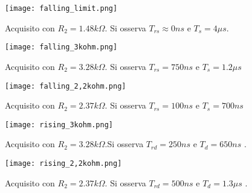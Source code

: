 \begin{figure}
	\centering
	\texttt{[image: falling\_limit.png]}
	\caption{Acquisito con $R_2=1.48 k\Omega $. Si osserva $T_{rs} \approx 0 ns$ e $T_s= 4 \mu s$.\label{f:falling_limit}}
\end{figure}

\begin{figure}
\centering
	\texttt{[image: falling\_3kohm.png]}
	\caption{Acquisito con $R_2= 3.28 k\Omega $. Si osserva $T_{rs}= 750 ns$ e $T_s= 1.2 \mu s $ \label{f:falling_3kohm}}
\end{figure}
\begin{figure}
	\centering
	\texttt{[image: falling\_2,2kohm.png]}
	\caption{Acquisito con $R_2= 2.37 k\Omega $. Si osserva $T_{rs}= 100 ns$ e $T_s= 700 ns$ \label{f:falling_2kohm}}
\end{figure}
\begin{figure}
	\centering
	\texttt{[image: rising\_3kohm.png]}
	\caption{Acquisito con $R_2= 3.28 k\Omega $.Si osserva $T_{rd}= 250 ns$ e $T_d= 650 ns$ .\label{f:rising_3kohm}}
\end{figure}
\begin{figure}
	\centering
	\texttt{[image: rising\_2,2kohm.png]}
	\caption{Acquisito con $R_2= 2.37 k\Omega $. Si osserva $T_{rd}= 500 ns$ e $T_d= 1.3 \mu s$ .\label{f:rising_2kohm}}
\end{figure}